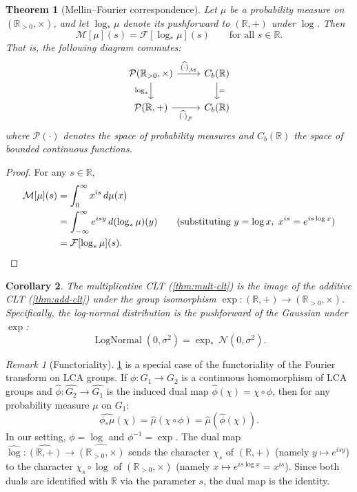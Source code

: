 \documentclass[12pt]{amsart}
\newtheorem{theorem}{Theorem}[section]
\newtheorem{corollary}[theorem]{Corollary}
\theoremstyle{definition}
\theoremstyle{remark}
\newtheorem*{remark}{Remark}
\newcommand{\R}{\mathbb{R}}
\newcommand{\Rpos}{\mathbb{R}_{>0}}
\newcommand{\cN}{\mathcal{N}}
\newcommand{\cF}{\mathcal{F}}
\newcommand{\cM}{\mathcal{M}}
\newcommand{\cP}{\mathcal{P}}
\begin{document}
\begin{theorem}[Mellin--Fourier correspondence]\label{thm:mellin-fourier}
Let $\mu$ be a probability measure on $(\Rpos, \times)$, and let $\log_*\mu$ denote its pushforward to $(\R, +)$ under $\log$. Then
\begin{equation}\label{eq:mellin-fourier}
\cM[\mu](s) = \cF[\log_*\mu](s) \qquad \text{for all } s \in \R.
\end{equation}
That is, the following diagram commutes:
\begin{equation}\label{eq:cd-measures}
\begin{tikzcd}
\cP(\Rpos, \times) \arrow[r, "\widehat{(\cdot)}_{\cM}"] \arrow[d, "\log_*"'] & C_b(\R) \arrow[d, "="] \\
\cP(\R, +) \arrow[r, "\widehat{(\cdot)}_{\cF}"'] & C_b(\R)
\end{tikzcd}
\end{equation}
where $\cP(\cdot)$ denotes the space of probability measures and $C_b(\R)$ the space of bounded continuous functions.
\end{theorem}

\begin{proof}
For any $s \in \R$,
\begin{align*}
\cM[\mu](s) &= \int_0^\infty x^{is}\, d\mu(x) \\
&= \int_{-\infty}^{\infty} e^{isy}\, d(\log_*\mu)(y) \qquad \text{(substituting } y = \log x,\; x^{is} = e^{is\log x}\text{)} \\
&= \cF[\log_*\mu](s). \qedhere
\end{align*}
\end{proof}

\begin{corollary}\label{cor:clt-image}
The multiplicative CLT (\cref{thm:mult-clt}) is the image of the additive CLT (\cref{thm:add-clt}) under the group isomorphism $\exp : (\R, +) \to (\Rpos, \times)$. Specifically, the log-normal distribution is the pushforward of the Gaussian under $\exp$:
\[
\operatorname{LogNormal}(0, \sigma^2) = \exp_*\, \cN(0, \sigma^2).
\]
\end{corollary}

\begin{remark}[Functoriality]\label{rmk:functoriality}
\cref{thm:mellin-fourier} is a special case of the functoriality of the Fourier transform on LCA groups. If $\phi : G_1 \to G_2$ is a continuous homomorphism of LCA groups and $\widehat{\phi} : \widehat{G_2} \to \widehat{G_1}$ is the induced dual map $\widehat{\phi}(\chi) = \chi \circ \phi$, then for any probability measure $\mu$ on $G_1$:
\[
\widehat{\phi_*\mu}(\chi) = \widehat{\mu}(\chi \circ \phi) = \widehat{\mu}\!\left(\widehat{\phi}(\chi)\right).
\]
In our setting, $\phi = \log$ and $\phi^{-1} = \exp$. The dual map $\widehat{\log} : \widehat{(\R,+)} \to \widehat{(\Rpos,\times)}$ sends the character $\chi_s$ of $(\R,+)$ (namely $y \mapsto e^{isy}$) to the character $\chi_s \circ \log$ of $(\Rpos,\times)$ (namely $x \mapsto e^{is\log x} = x^{is}$). Since both duals are identified with $\R$ via the parameter $s$, the dual map is the identity.
\end{remark}
\end{document}
